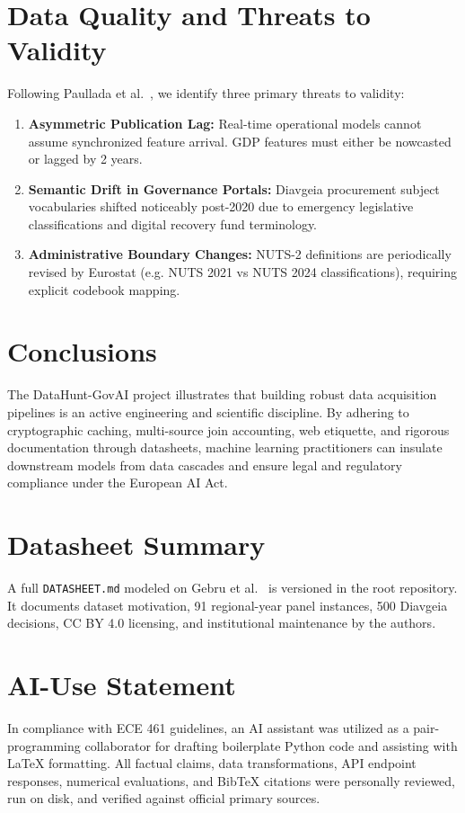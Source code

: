 \documentclass[11pt,a4paper]{article}
\begin{document}
\section{Data Quality and Threats to Validity}
Following Paullada et al.~\citep{paullada2021data}, we identify three primary threats to validity:
\begin{enumerate}
    \item \textbf{Asymmetric Publication Lag:} Real-time operational models cannot assume synchronized feature arrival. GDP features must either be nowcasted or lagged by 2 years.
    \item \textbf{Semantic Drift in Governance Portals:} Diavgeia procurement subject vocabularies shifted noticeably post-2020 due to emergency legislative classifications and digital recovery fund terminology.
    \item \textbf{Administrative Boundary Changes:} NUTS-2 definitions are periodically revised by Eurostat (e.g. NUTS 2021 vs NUTS 2024 classifications), requiring explicit codebook mapping.
\end{enumerate}

\section{Conclusions}
The DataHunt-GovAI project illustrates that building robust data acquisition pipelines is an active engineering and scientific discipline. By adhering to cryptographic caching, multi-source join accounting, web etiquette, and rigorous documentation through datasheets, machine learning practitioners can insulate downstream models from data cascades and ensure legal and regulatory compliance under the European AI Act.

\appendix
\section{Datasheet Summary}
A full \texttt{DATASHEET.md} modeled on Gebru et al.~\citep{gebru2021datasheets} is versioned in the root repository. It documents dataset motivation, 91 regional-year panel instances, 500 Diavgeia decisions, CC BY 4.0 licensing, and institutional maintenance by the authors.

\section{AI-Use Statement}
In compliance with ECE 461 guidelines, an AI assistant was utilized as a pair-programming collaborator for drafting boilerplate Python code and assisting with LaTeX formatting. All factual claims, data transformations, API endpoint responses, numerical evaluations, and BibTeX citations were personally reviewed, run on disk, and verified against official primary sources.



\end{document}
